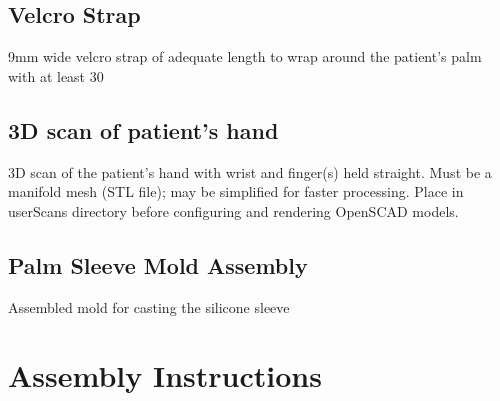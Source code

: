 \documentclass[11pt]{article}
\begin{document}
\hypertarget{thing_velcro\_strap}{\subsection{Velcro Strap}}
9mm wide velcro strap of adequate length to wrap around the patient's palm with at least 30%

\hypertarget{thing_hand\_scan}{\subsection{3D scan of patient's hand}}
3D scan of the patient's hand with wrist and finger(s) held straight. Must be a manifold mesh (STL file); may be simplified for faster processing. Place in userScans directory before configuring and rendering OpenSCAD models.

\hypertarget{thing_mold\_assembly}{\subsection{Palm Sleeve Mold Assembly}}
Assembled mold for casting the silicone sleeve

\newpage

\section{Assembly Instructions}
\end{document}
